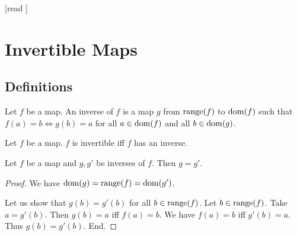 \documentclass[10pt]{article}
\begin{document}
  \begin{imports}
    \begin{forthel}
      [read ]
    \end{forthel}
  \end{imports}


  \section*{Invertible Maps}

  \subsection*{Definitions}

  \begin{forthel}
    \begin{definition}[id=FOUNDATIONS_09_7776974319648768,printid]
      Let $f$ be a map.
      An inverse of $f$ is a map $g$ from $\textrm{range}(f)$ to $\operatorname{dom}(f)$ such that $f(a) = b \iff g(b) = a$ for all $a \in \operatorname{dom}(f)$ and all $b \in \operatorname{dom}(g)$.
    \end{definition}
  \end{forthel}

  \begin{forthel}
    \begin{definition}[id=FOUNDATIONS_09_3430350086733824,printid]
      Let $f$ be a map.
      $f$ is invertible iff $f$ has an inverse.
    \end{definition}
  \end{forthel}

  \begin{forthel}
    \begin{lemma}[id=FOUNDATIONS_09_5108611793551360,printid]
      Let $f$ be a map and $g, g'$ be inverses of $f$.
      Then $g = g'$.
    \end{lemma}
    \begin{proof}
      We have $\operatorname{dom}(g) = \textrm{range}(f) = \operatorname{dom}(g')$.

      Let us show that $g(b) = g'(b)$ for all $b \in \textrm{range}(f)$.
        Let $b \in \textrm{range}(f)$.
        Take $a = g'(b)$.
        Then $g(b) = a$ iff $f(a) = b$.
        We have $f(a) = b$ iff $g'(b) = a$.
        Thus $g(b) = g'(b)$.
      End.
    \end{proof}
  \end{forthel}
\end{document}
